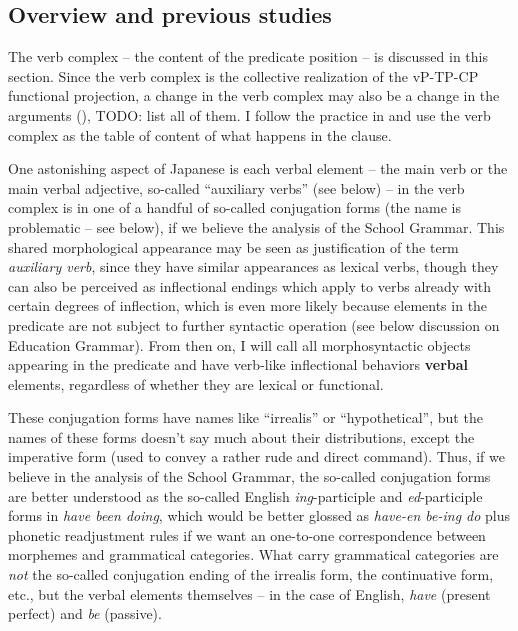 \documentclass[UTF8, a4paper, oneside, scheme=plain]{ctexart}
\newcommand*{\concept}[1]{\textbf{#1}}
\newcommand*{\term}[1]{\emph{#1}}
\newcommand{\corpus}[1]{\emph{#1}}
\begin{document}
\subsection{Overview and previous studies}\label{sec:verb-complex-overview}

The verb complex -- the content of the predicate position -- is discussed in this section.
Since the verb complex is the collective realization of the vP-TP-CP functional projection,
a change in the verb complex may also be a change in 
the arguments (),
TODO: list all of them.
I follow the practice in \citet{jacques2021grammar}
and use the verb complex as the table of content of what happens in the clause.

One astonishing aspect of Japanese is 
each verbal element -- the main verb or the main verbal adjective, so-called ``auxiliary verbs'' (see below) -- 
in the verb complex is in one of a handful of so-called conjugation forms (the name is problematic -- see below),
if we believe the analysis of the School Grammar.
This shared morphological appearance may be seen as justification of the term \term{auxiliary verb},
since they have similar appearances as lexical verbs,
though they can also be perceived as inflectional endings 
which apply to verbs already with certain degrees of inflection,
which is even more likely 
because elements in the predicate are not subject to further syntactic operation
(see below discussion on Education Grammar).
From then on, I will call all morphosyntactic objects 
appearing in the predicate and have verb-like inflectional behaviors \concept{verbal} elements,
regardless of whether they are lexical or functional.

These conjugation forms have names like ``irrealis'' or ``hypothetical'',
but the names of these forms doesn't say much about their distributions,
except the imperative form (used to convey a rather rude and direct command).
Thus, if we believe in the analysis of the School Grammar,
the so-called conjugation forms are better understood as the 
so-called English \corpus{ing}-participle and \corpus{ed}-participle forms 
in \corpus{have been doing},
which would be better glossed as 
\corpus{have-en be-ing do} plus phonetic readjustment rules
if we want an one-to-one correspondence between morphemes and grammatical categories.
What carry grammatical categories are \emph{not} the so-called conjugation ending of 
the irrealis form, the continuative form, etc.,
but the verbal elements themselves -- 
in the case of English,
\corpus{have} (present perfect) and \corpus{be} (passive).
\end{document}
